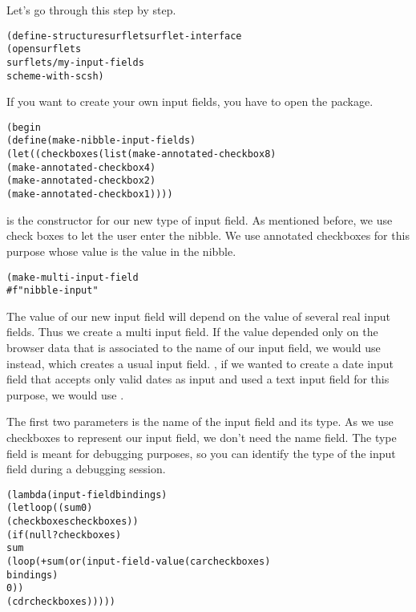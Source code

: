 Let's go through this \surflet step by step.

\begin{alltt}
(define-structure surflet surflet-interface
  (open surflets
        surflets/my-input-fields
        scheme-with-scsh)
\end{alltt}

If you want to create your own input fields, you have to open the
 package.

\begin{alltt}
  (begin
    (define (make-nibble-input-fields)
      (let ((checkboxes (list (make-annotated-checkbox 8)
                              (make-annotated-checkbox 4)
                              (make-annotated-checkbox 2)
                              (make-annotated-checkbox 1))))
\end{alltt}

 is the constructor for our new type of
input field.  As mentioned before, we use check boxes to let the user
enter the nibble.  We use annotated checkboxes for this purpose whose
value is the value in the nibble.

\begin{alltt}
        (make-multi-input-field
         #f "nibble-input"
\end{alltt}

The value of our new input field will depend on the value of several
real input fields.  Thus we create a multi input field.  If the value
depended only on the browser data that is associated to the name of
our input field, we would use  instead, which
creates a usual input field.  \Eg, if we wanted to create a date input
field that accepts only valid dates as input and used a text input
field for this purpose, we would use .

The first two parameters is the name of the input field and its type.
As we use checkboxes to represent our input field, we don't need the
name field.  The type field is meant for debugging purposes, so you
can identify the type of the input field during a debugging session.

\begin{alltt}
         (lambda (input-field bindings)
           (let loop ((sum 0)
                      (checkboxes checkboxes))
             (if (null? checkboxes)
                 sum
                 (loop (+ sum (or (input-field-value (car checkboxes) 
                                                     bindings)
                                  0))
                       (cdr checkboxes)))))
\end{alltt}

